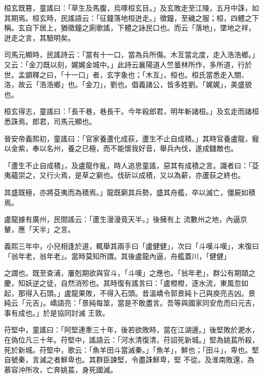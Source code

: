 \begin{pinyinscope}
 桓玄既篡，童謠曰：「草生及馬腹，烏啄桓玄目。」及玄敗走至江陵，五月中誅，如其期焉。桓玄時，民謠語云：「征鐘落地桓迸走。」徵鐘，至穢之服；桓，四體之下稱。玄自下居上，猶徵鐘之廁歌謠，下體之詠民口也。而云「落地」，墜地之祥，迸走之言，其驗明矣。



 司馬元顯時，民謠詩云：「當有十一口，當為兵所傷。木亙當北度，走入浩浩鄉。」又云：「金刀既以刻，娓娓金城中。」此詩云襄陽道人竺曇林所作，多所道，行於世。孟顗釋之曰，「十一口」者，玄字象也；「木亙」，桓也。桓氏當悉走入關、洛，故云「浩浩鄉」也。「金刀」，劉也。倡義諸公，皆多姓劉。「娓娓」，美盛貌也。



 桓玄得志，童謠曰：「長干巷，巷長干。今年殺郎君，明年斬諸桓。」及玄走而諸桓悉誅焉。郎君，司馬元顯也。



 晉安帝義熙初，童謠曰：「官家養蘆化成荻，蘆生不止自成積。」其時官養盧龍，寵以金紫，奉以名州，養之已極，而不能懷我好音，舉兵內伐，遂成讎敵也。



 「蘆生不止自成積」，及盧龍作亂，時人追思童謠，惡其有成積之言。識者曰：「芟夷蘊崇之，又行火焉，是草之窮也。伐斫以成積，又以為薪，亦蘆荻之終也。



 其盛既極，亦將芟夷而為積焉。」龍既窮其兵勢，盛其舟艦，卒以滅亡，僵屍如積焉。



 盧龍據有廣州，民間謠云：「蘆生漫漫竟天半。」後擁有上
 流數州之地，內逼京輦，應「天半」之言。



 義熙三年中，小兒相逢於道，輒舉其兩手曰「盧健健」，次曰「斗嘆斗嘆」，末復曰「翁年老，翁年老」。當時莫知所謂。其後盧龍內逼，舟艦蓋川，「健健」



 之謂也。既至查浦，屢剋期欲與官斗，「斗嘆」之應也。「翁年老」，群公有期頤之慶，知妖逆之徒，自然消殄也。其時復有謠言曰：「盧橙橙，逐水流，東風忽如起，那得入石頭。」盧龍果敗，不得入石頭。昔溫嶠令郭景純卜己與庾亮吉凶。景純云「元吉」。嶠語亮：「景純每筮，當是不敢盡言。吾等與國家同安危而曰元吉，事有成也。」於是協同討滅
 王敦。



 苻堅中，童謠曰：「阿堅連牽三十年，後若欲敗時，當在江湖邊。」後堅敗於淝水，在偽位凡三十年。苻堅中，謠語云：「河水清復清，苻詔死新城。」堅為姚萇所殺，死於新城。苻堅中，歌云：「魚羊田斗當滅秦。」「魚羊」，鮮也；「田斗」，卑也。堅自號秦，言滅之者鮮卑也。其群臣諫堅，令盡誅鮮卑，堅
 不從。及淮南敗還，為慕容沖所攻，亡奔姚萇，身死國滅。




\end{pinyinscope}
